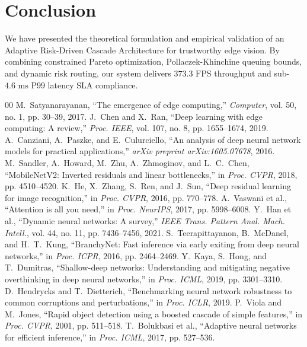 \documentclass[conference]{IEEEtran}
\begin{document}
\section{Conclusion}
We have presented the theoretical formulation and empirical validation of an Adaptive Risk-Driven Cascade Architecture for trustworthy edge vision. By combining constrained Pareto optimization, Pollaczek-Khinchine queuing bounds, and dynamic risk routing, our system delivers $373.3\text{ FPS}$ throughput and sub-$4.6\text{ ms}$ P99 latency SLA compliance.

\begin{thebibliography}{00}
 M.~Satyanarayanan, ``The emergence of edge computing,'' \emph{Computer}, vol. 50, no. 1, pp. 30--39, 2017.
 J.~Chen and X.~Ran, ``Deep learning with edge computing: A review,'' \emph{Proc. IEEE}, vol. 107, no. 8, pp. 1655--1674, 2019.
 A.~Canziani, A.~Paszke, and E.~Culurciello, ``An analysis of deep neural network models for practical applications,'' \emph{arXiv preprint arXiv:1605.07678}, 2016.
 M.~Sandler, A.~Howard, M.~Zhu, A.~Zhmoginov, and L.~C.~Chen, ``MobileNetV2: Inverted residuals and linear bottlenecks,'' in \emph{Proc. CVPR}, 2018, pp. 4510--4520.
 K.~He, X.~Zhang, S.~Ren, and J.~Sun, ``Deep residual learning for image recognition,'' in \emph{Proc. CVPR}, 2016, pp. 770--778.
 A.~Vaswani et al., ``Attention is all you need,'' in \emph{Proc. NeurIPS}, 2017, pp. 5998--6008.
 Y.~Han et al., ``Dynamic neural networks: A survey,'' \emph{IEEE Trans. Pattern Anal. Mach. Intell.}, vol. 44, no. 11, pp. 7436--7456, 2021.
 S.~Teerapittayanon, B.~McDanel, and H.~T.~Kung, ``BranchyNet: Fast inference via early exiting from deep neural networks,'' in \emph{Proc. ICPR}, 2016, pp. 2464--2469.
 Y.~Kaya, S.~Hong, and T.~Dumitras, ``Shallow-deep networks: Understanding and mitigating negative overthinking in deep neural networks,'' in \emph{Proc. ICML}, 2019, pp. 3301--3310.
 D.~Hendrycks and T.~Dietterich, ``Benchmarking neural network robustness to common corruptions and perturbations,'' in \emph{Proc. ICLR}, 2019.
 P.~Viola and M.~Jones, ``Rapid object detection using a boosted cascade of simple features,'' in \emph{Proc. CVPR}, 2001, pp. 511--518.
 T.~Bolukbasi et al., ``Adaptive neural networks for efficient inference,'' in \emph{Proc. ICML}, 2017, pp. 527--536.

\end{thebibliography}
\end{document}
